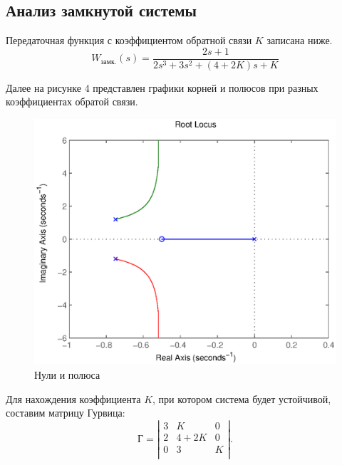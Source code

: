 \documentclass[a4paper, 12pt]{article}
\begin{document}
\newpage
\begin{center}
\section{Анализ замкнутой системы}
\end{center} \par

Передаточная функция с коэффициентом обратной связи $K$ записана ниже.
\begin{equation}
    W_\text{замк.}(s) = \frac{2s + 1}{2s^3 + 3s^2 + (4+2K)s + K}
\end{equation} \par
Далее на рисунке 4 представлен графики корней и полюсов при разных коэффициентах обратой связи. \par
\begin{figure} [h!]
    \centering
	\includegraphics[scale=0.9]{image/rlocust.eps}
    \caption{Нули и полюса}
\end{figure}
\par 
Для нахождения коэффициента $K$, при котором система будет устойчивой, составим матрицу Гурвица:
\begin{equation}
	\text{Г}= \left|
	\begin{array}{ccc}
		3 & K & 0\\
		2 & 4+2K & 0\\
		0 & 3 & K\\
	\end{array}
	\right|.
\end{equation}
\end{document}

